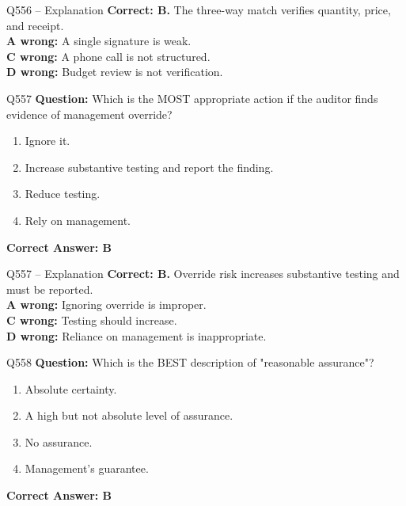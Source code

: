 \documentclass[aspectratio=169,10pt]{beamer}
\begin{document}
	\begin{frame}[t]{Q556 -- Explanation}
		\small
		\textbf{Correct: B.} The three-way match verifies quantity, price, and receipt. \\[4pt]
		\textbf{A wrong:} A single signature is weak. \\[2pt]
		\textbf{C wrong:} A phone call is not structured. \\[2pt]
		\textbf{D wrong:} Budget review is not verification.
	\end{frame}
	
	\begin{frame}[t]{Q557}
		\small
		\textbf{Question:} Which is the MOST appropriate action if the auditor finds evidence of management override?
		\begin{enumerate}[label=\Alph*.,itemsep=1pt,topsep=2pt]
			\item Ignore it.
			\item Increase substantive testing and report the finding.
			\item Reduce testing.
			\item Rely on management.
		\end{enumerate}
		\vspace{4pt}
		\textbf{Correct Answer: B}
	\end{frame}
	
	\begin{frame}[t]{Q557 -- Explanation}
		\small
		\textbf{Correct: B.} Override risk increases substantive testing and must be reported. \\[4pt]
		\textbf{A wrong:} Ignoring override is improper. \\[2pt]
		\textbf{C wrong:} Testing should increase. \\[2pt]
		\textbf{D wrong:} Reliance on management is inappropriate.
	\end{frame}
	
	\begin{frame}[t]{Q558}
		\small
		\textbf{Question:} Which is the BEST description of "reasonable assurance"?
		\begin{enumerate}[label=\Alph*.,itemsep=1pt,topsep=2pt]
			\item Absolute certainty.
			\item A high but not absolute level of assurance.
			\item No assurance.
			\item Management's guarantee.
		\end{enumerate}
		\vspace{4pt}
		\textbf{Correct Answer: B}
	\end{frame}
	
\end{document}
